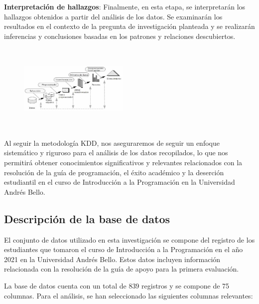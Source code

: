 \textbf{Interpretación de hallazgos}: Finalmente, en esta etapa, se interpretarán los hallazgos obtenidos a partir del análisis de los datos. Se examinarán los resultados en el contexto de la pregunta de investigación planteada y se realizarán inferencias y conclusiones basadas en los patrones y relaciones descubiertos.

\begin{figure}[h]
  \centering
  \includegraphics[width=2.06111in,height=1.68611in]{img/KDD.png}
\end{figure}

\vfil
Al seguir la metodología KDD, nos aseguraremos de seguir un enfoque sistemático y riguroso para el análisis de los datos recopilados, lo que nos permitirá obtener conocimientos significativos y relevantes relacionados con la resolución de la guía de programación, el éxito académico y la deserción estudiantil en el curso de Introducción a la Programación en la Universidad Andrés Bello.

\vfill

\vfill
\subsection*{Descripción de la base de datos}

El conjunto de datos utilizado en esta investigación se compone del registro de los estudiantes que tomaron el curso de
Introducción a la Programación en el año 2021 en la Universidad Andrés Bello. Estos datos incluyen información relacionada con la
resolución de la guía de apoyo para la primera evaluación.

La base de datos cuenta con un total de 839 registros y se compone de 75 columnas. Para el análisis,
se han seleccionado las siguientes columnas relevantes:


